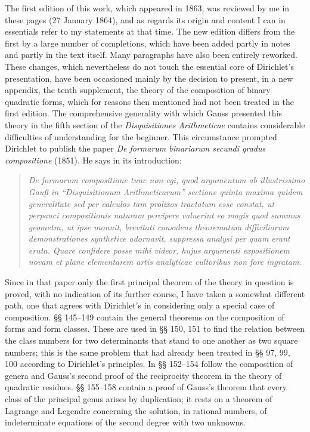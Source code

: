 \documentclass[11pt]{article}
\newcommand{\origpage}[1]{\par\vspace{0.25em}\noindent{\footnotesize\itshape [Printed page #1]}\par\vspace{0.25em}}
\begin{document}
The first edition of this work, which appeared in 1863, was reviewed by me in these pages (27 January 1864), and as regards its origin and content I can in essentials refer to my statements at that time. The new edition differs from the first by a large number of completions, which have been added partly in notes and partly in the text itself. Many paragraphs have also been entirely reworked. These changes, which nevertheless do not touch the essential core of Dirichlet's presentation, have been occasioned mainly by the decision to present, in a new appendix, the tenth supplement, the theory of the composition of binary quadratic forms, which for reasons then mentioned had not been treated in the first edition. The comprehensive generality with which Gauss presented this theory in the fifth section of the \textit{Disquisitiones Arithmeticae} contains considerable difficulties of understanding for the beginner. This circumstance prompted Dirichlet to publish the paper \textit{De formarum binariarum secundi gradus compositione} (1851). He says in its introduction:

\begin{quote}\itshape
De formarum compositione tunc non egi, quod argumentum ab illustrissimo Gauß in ``Disquisitionum Arithmeticarum'' sectione quinta maxima quidem generalitate sed per calculos tam prolixos tractatum esse constat, ut perpauci compositionis naturam percipere valuerint eo magis quod summus geometra, ut ipse monuit, brevitati consulens theorematum difficiliorum demonstrationes synthetice adornavit, suppressa analysi per quam erant eruta. Quare confidere posse mihi videor, hujus argumenti expositionem novam et plane elementarem artis analyticae cultoribus non fore ingratam.
\end{quote}

\origpage{400}
Since in that paper only the first principal theorem of the theory in question is proved, with no indication of its further course, I have taken a somewhat different path, one that agrees with Dirichlet's in considering only a special case of composition. §§ 145--149 contain the general theorems on the composition of forms and form classes. These are used in §§ 150, 151 to find the relation between the class numbers for two determinants that stand to one another as two square numbers; this is the same problem that had already been treated in §§ 97, 99, 100 according to Dirichlet's principles. In §§ 152--154 follow the composition of genera and Gauss's second proof of the reciprocity theorem in the theory of quadratic residues. §§ 155--158 contain a proof of Gauss's theorem that every class of the principal genus arises by duplication; it rests on a theorem of Lagrange and Legendre concerning the solution, in rational numbers, of indeterminate equations of the second degree with two unknowns.
\end{document}
